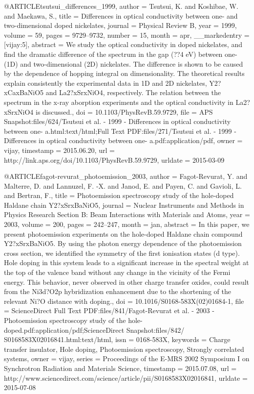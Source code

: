@ARTICLE{tsutsui_differences_1999,
  author = {Tsutsui, K. and Koshibae, W. and Maekawa, S.},
  title = {Differences in optical conductivity between one- and two-dimensional
	doped nickelates},
  journal = {Physical Review B},
  year = {1999},
  volume = {59},
  pages = {9729--9732},
  number = {15},
  month = apr,
  __markedentry = {[vijay:5]},
  abstract = {We study the optical conductivity in doped nickelates, and find the
	dramatic difference of the spectrum in the gap (??4 eV) between one-
	(1D) and two-dimensional (2D) nickelates. The difference is shown
	to be caused by the dependence of hopping integral on dimensionality.
	The theoretical results explain consistently the experimental data
	in 1D and 2D nickelates, Y2?xCaxBaNiO5 and La2?xSrxNiO4, respectively.
	The relation between the spectrum in the x-ray aborption experiments
	and the optical conductivity in La2?xSrxNiO4 is discussed.},
  doi = {10.1103/PhysRevB.59.9729},
  file = {APS Snapshot:files/624/Tsutsui et al. - 1999 - Differences in optical conductivity between one- a.html:text/html;Full Text PDF:files/271/Tsutsui et al. - 1999 - Differences in optical conductivity between one- a.pdf:application/pdf},
  owner = {vijay},
  timestamp = {2015.06.20},
  url = {http://link.aps.org/doi/10.1103/PhysRevB.59.9729},
  urldate = {2015-03-09}
}

@ARTICLE{fagot-revurat_photoemission_2003,
  author = {Fagot-Revurat, Y. and Malterre, D. and Lannuzel, F. -X. and Janod,
	E. and Payen, C. and Gavioli, L. and Bertran, F.},
  title = {Photoemission spectroscopy study of the hole-doped {Haldane} chain
	{Y}2?{xSrxBaNiO}5},
  journal = {Nuclear Instruments and Methods in Physics Research Section B: Beam
	Interactions with Materials and Atoms},
  year = {2003},
  volume = {200},
  pages = {242--247},
  month = jan,
  abstract = {In this paper, we present photoemission experiments on the hole-doped
	Haldane chain compound Y2?xSrxBaNiO5. By using the photon energy
	dependence of the photoemission cross section, we identified the
	symmetry of the first ionisation states (d type). Hole doping in
	this system leads to a significant increase in the spectral weight
	at the top of the valence band without any change in the vicinity
	of the Fermi energy. This behavior, never observed in other charge
	transfer oxides, could result from the Ni3d?O2p hybridization enhancement
	due to the shortening of the relevant Ni?O distance with doping.},
  doi = {10.1016/S0168-583X(02)01684-1},
  file = {ScienceDirect Full Text PDF:files/841/Fagot-Revurat et al. - 2003 - Photoemission             spectroscopy study of the hole-doped.pdf:application/pdf;ScienceDirect Snapshot:files/842/                S0168583X02016841.html:text/html},
  issn = {0168-583X},
  keywords = {Charge transfer insulator, Hole doping, Photoemission spectroscopy,
	Strongly correlated systems},
  owner = {vijay},
  series = {Proceedings of the {E}-{MRS} 2002 {Symposium} {I} on {Synchrotron}
	{Radiation} and {Materials} {Science}},
  timestamp = {2015.07.08},
  url = {http://www.sciencedirect.com/science/article/pii/S0168583X02016841},
  urldate = {2015-07-08}
}

